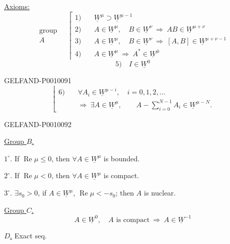 \underline{Axioms:}
\[
\substack{\text{group}\\ A}
\quad\left\lceil
\begin{aligned}
1)\quad &\underline W^\mu\supset\underline W^{\mu-1}\\
2)\quad &A\in\underline W^\mu,\quad B\in\underline W^\nu
 \ \Longrightarrow\ AB\in\underline W^{\mu+\nu}\\
3)\quad &A\in\underline W^\mu,\quad B\in\underline W^\nu
 \ \Longrightarrow\ [A,B]\in\underline W^{\mu+\nu-1}\\
4)\quad &A\in\underline W^\mu\ \Longrightarrow\ A^*\in\underline W^{\bar\mu}
\end{aligned}\right.
\]
\[
5)\quad I\in\underline W^0
\]


\begin{GelfandAdjacentEvidence}{GELFAND-P001009}{1}
\[
\left\lfloor
\begin{aligned}
6)\quad&\forall A_i\in\underline W^{\mu-i},\quad i=0,1,2,\ldots\\
&\Longrightarrow\ \exists A\in\underline W^\mu,\qquad
A-\sum_{i=0}^{N-1}A_i\in\underline W^{\mu-N}.
\end{aligned}\right.
\]
\end{GelfandAdjacentEvidence}
\begin{GelfandAdjacentEvidence}{GELFAND-P001009}{2}


\underline{Group $B$.}

$1^{\circ}$. If $\operatorname{Re}\mu\leq0$, then $\forall A\in\underline W^\mu$ is bounded.

$2^{\circ}$. If $\operatorname{Re}\mu<0$, then $\forall A\in\underline W^\mu$ is compact.

$3^{\circ}$. $\exists s_0>0$, if $A\in\underline W^\mu$,
$\operatorname{Re}\mu<-s_0$; then $A$ is nuclear.

\underline{Group $C$.}
\[
A\in\underline W^0,\quad A\text{ is compact}
\ \Longrightarrow\ A\in\underline W^{-1}
\]

\underline{$D$.} Exact seq.

\end{GelfandAdjacentEvidence}


